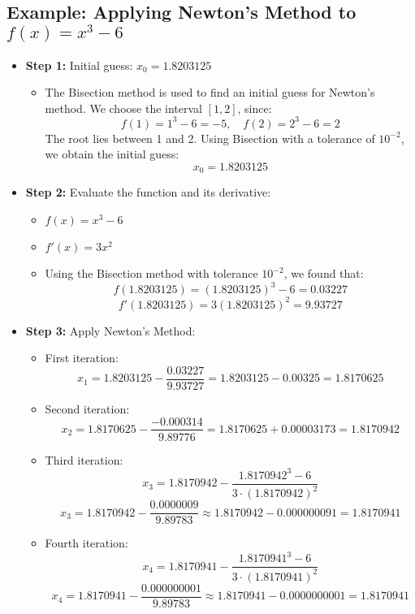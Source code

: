 \documentclass[9pt]{extarticle}
\begin{document}
\subsection{Example: Applying Newton's Method to \( f(x) = x^3 - 6 \)}

\begin{itemize}
    \item \textbf{Step 1:} Initial guess: \(x_0 = 1.8203125\)
    \begin{itemize}
        \item The Bisection method is used to find an initial guess for Newton's method. We choose the interval \([1, 2]\), since:
\[
f(1) = 1^3 - 6 = -5, \quad f(2) = 2^3 - 6 = 2
\]
The root lies between 1 and 2. Using Bisection with a tolerance of \( 10^{-2} \), we obtain the initial guess:
\[
x_0 = 1.8203125
\]
    \end{itemize} 
    \item \textbf{Step 2:} Evaluate the function and its derivative:
    \begin{itemize}
        \item \(f(x) = x^3 - 6\)
        \item \(f'(x) = 3x^2\)
        \item Using the Bisection method with tolerance \(10^{-2}\), we found that:
        \[
        f(1.8203125) = (1.8203125)^3 - 6 = 0.03227
        \]
        \[
        f'(1.8203125) = 3(1.8203125)^2 = 9.93727
        \]
    \end{itemize}
    
    \item \textbf{Step 3:} Apply Newton's Method:
    \begin{itemize}
        \item First iteration:
        \[
        x_1 = 1.8203125 - \frac{0.03227}{9.93727} = 1.8203125 - 0.00325 = 1.8170625
        \]
        \item Second iteration:
        \[
        x_2 = 1.8170625 - \frac{-0.000314}{9.89776} = 1.8170625 + 0.00003173 = 1.8170942
        \]
        \item Third iteration:
        \[
        x_3 = 1.8170942 - \frac{1.8170942^3 - 6}{3 \cdot (1.8170942)^2}
        \]
        \[
        x_3 = 1.8170942 - \frac{0.0000009}{9.89783} \approx 1.8170942 - 0.000000091 = 1.8170941
        \]
        \item Fourth iteration:
        \[
        x_4 = 1.8170941 - \frac{1.8170941^3 - 6}{3 \cdot (1.8170941)^2}
        \]
        \[
        x_4 = 1.8170941 - \frac{0.000000001}{9.89783} \approx 1.8170941 - 0.0000000001 = 1.8170941
        \]
    \end{itemize}
\end{itemize}
\end{document}
